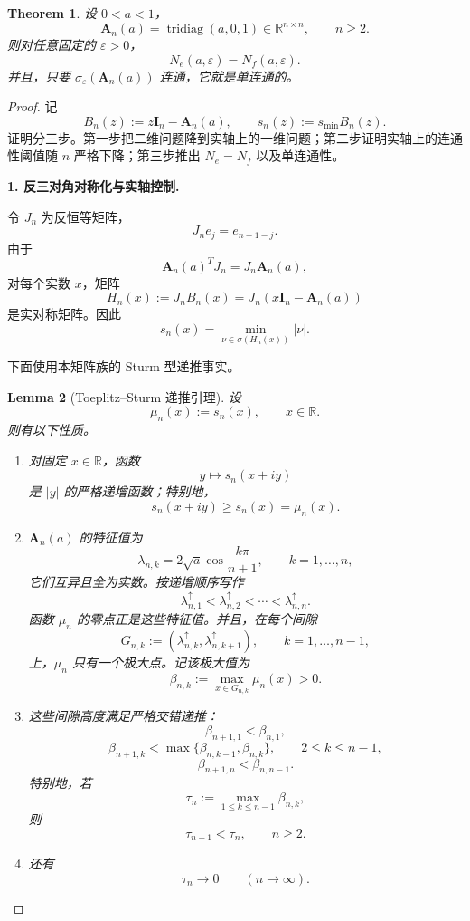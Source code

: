 \documentclass[11pt]{ctexart}
\newtheorem{theorem}{Theorem}
\newtheorem{lemma}[theorem]{Lemma}
\DeclareMathOperator{\tridiag}{tridiag}
\newcommand{\R}{\mathbb R}
\newcommand{\eps}{\varepsilon}
\newcommand{\A}{\mathbf A}
\newcommand{\I}{\mathbf I}
\begin{document}
\begin{theorem}
设 \(0<a<1\)，
\[
\A_n(a)=\tridiag(a,0,1)\in\R^{n\times n},\qquad n\ge 2.
\]
则对任意固定的 \(\eps>0\)，
\[
N_e(a,\eps)=N_f(a,\eps).
\]
并且，只要 \(\sigma_\eps(\A_n(a))\) 连通，它就是单连通的。
\end{theorem}

\begin{proof}
记
\[
B_n(z):=z\I_n-\A_n(a),\qquad
s_n(z):=s_{\min}B_n(z).
\]
证明分三步。第一步把二维问题降到实轴上的一维问题；第二步证明实轴上的连通性阈值随 \(n\) 严格下降；第三步推出 \(N_e=N_f\) 以及单连通性。

\medskip

\noindent\textbf{1. 反三对角对称化与实轴控制.}

令 \(J_n\) 为反恒等矩阵，
\[
J_n e_j=e_{n+1-j}.
\]
由于
\[
\A_n(a)^T J_n=J_n\A_n(a),
\]
对每个实数 \(x\)，矩阵
\[
H_n(x):=J_nB_n(x)=J_n(x\I_n-\A_n(a))
\]
是实对称矩阵。因此
\[
s_n(x)=\min_{\nu\in\sigma(H_n(x))}|\nu|.
\tag{1}
\]

下面使用本矩阵族的 Sturm 型递推事实。

\begin{lemma}[Toeplitz--Sturm 递推引理]
设
\[
\mu_n(x):=s_n(x),\qquad x\in\R.
\]
则有以下性质。

\begin{enumerate}
\item 对固定 \(x\in\R\)，函数
\[
y\longmapsto s_n(x+iy)
\]
是 \(|y|\) 的严格递增函数；特别地，
\[
s_n(x+iy)\ge s_n(x)=\mu_n(x).
\tag{2}
\]

\item \(\A_n(a)\) 的特征值为
\[
\lambda_{n,k}=2\sqrt a\cos\frac{k\pi}{n+1},
\qquad k=1,\dots,n,
\tag{3}
\]
它们互异且全为实数。按递增顺序写作
\[
\lambda_{n,1}^{\uparrow}<\lambda_{n,2}^{\uparrow}<\cdots<\lambda_{n,n}^{\uparrow}.
\]
函数 \(\mu_n\) 的零点正是这些特征值。并且，在每个间隙
\[
G_{n,k}:=(\lambda_{n,k}^{\uparrow},\lambda_{n,k+1}^{\uparrow}),
\qquad k=1,\dots,n-1,
\]
上，\(\mu_n\) 只有一个极大点。记该极大值为
\[
\beta_{n,k}:=\max_{x\in G_{n,k}}\mu_n(x)>0.
\tag{4}
\]

\item 这些间隙高度满足严格交错递推：
\[
\beta_{n+1,1}<\beta_{n,1},
\tag{5a}
\]
\[
\beta_{n+1,k}<\max\{\beta_{n,k-1},\beta_{n,k}\},
\qquad 2\le k\le n-1,
\tag{5b}
\]
\[
\beta_{n+1,n}<\beta_{n,n-1}.
\tag{5c}
\]
特别地，若
\[
\tau_n:=\max_{1\le k\le n-1}\beta_{n,k},
\tag{6}
\]
则
\[
\tau_{n+1}<\tau_n,\qquad n\ge2.
\tag{7}
\]

\item 还有
\[
\tau_n\longrightarrow0\qquad(n\to\infty).
\tag{8}
\]
\end{enumerate}
\end{lemma}


\end{proof}
\end{document}
